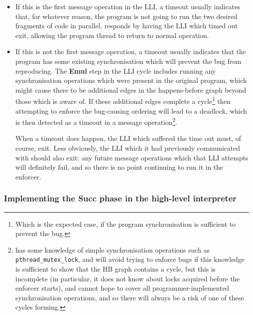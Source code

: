 \begin{itemize}
\item
  If this is the first message operation in the LLI, a timeout usually
  indicates that, for whatever reason, the program is not going to run
  the two desired fragments of code in parallel.  {\Technique}
  responds by having the LLI which timed out exit, allowing the
  program thread to return to normal operation.

\item
  If this is not the first message operation, a timeout usually
  indicates that the program has some existing synchronisation which
  will prevent the bug from reproducing.  The \textbf{Emul} step in
  the LLI cycle includes running any synchronisation operations which
  were present in the original program, which might cause there to be
  additional edges in the happens-before graph beyond those which
  {\technique} is aware of.  If these additional edges complete a
  cycle\footnote{Which is the expected case, if the program
    synchronisation is sufficient to prevent the bug.} then attempting
  to enforce the bug-causing ordering will lead to a deadlock, which
  is then detected as a timeout in a message
  operation\footnote{{\Technique} has some knowledge of simple
    synchronisation operations such as \texttt{pthread\_mutex\_lock},
    and will avoid trying to enforce bugs if this knowledge is
    sufficient to show that the HB graph contains a cycle, but this is
    incomplete (in particular, it does not know about locks acquired
    before the enforcer starts), and cannot hope to cover all
    programmer-implemented synchronisation operations, and so there will always be a risk of one of these
    cycles forming.}.

  When a timeout does happen, the LLI which suffered the time out
  must, of course, exit.  Less obviously, the LLI which it had
  previously communicated with should also exit: any future message
  operations which that LLI attempts will definitely fail, and so
  there is no point continuing to run it in the enforcer.
\end{itemize}


\subsubsection{Implementing the \textbf{Succ} phase in the high-level interpreter}
\label{sect:enforce:succ}

